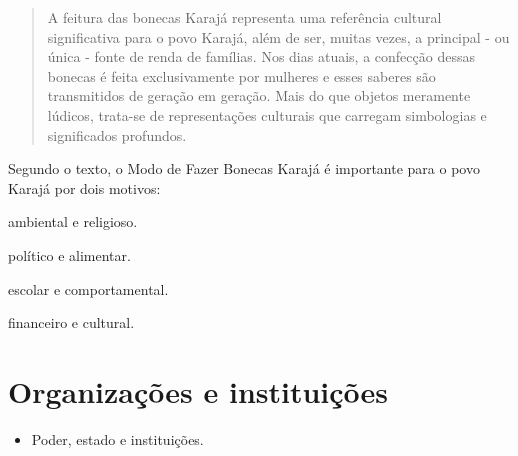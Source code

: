 \begin{quote}
A feitura das bonecas Karajá representa uma referência cultural significativa para o povo Karajá, além de ser, muitas vezes, a principal - ou única - fonte de renda de famílias. Nos dias atuais, a confecção dessas bonecas é feita exclusivamente por mulheres e esses saberes são transmitidos de geração em geração. Mais do que objetos meramente lúdicos, trata-se de representações culturais que carregam simbologias e significados profundos.
\end{quote}

Segundo o texto, o Modo de Fazer Bonecas Karajá é importante para o povo
Karajá por dois motivos:

\begin{minipage}{.5\textwidth}
\begin{escolha}
\item ambiental e religioso.

\item político e alimentar.

\item escolar e comportamental.

\item financeiro e cultural.
\end{escolha}
\end{minipage}

\chapter{Organizações e instituições}



\begin{itemize}
\item Poder, estado e instituições.
\end{itemize}


